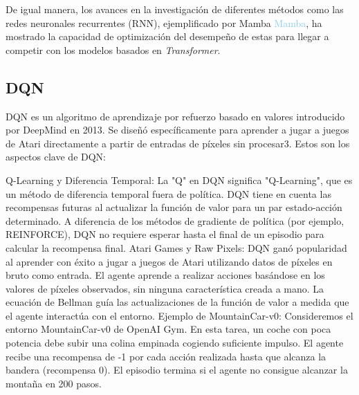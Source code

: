 De igual manera, los avances en la investigación de diferentes métodos como las redes neuronales recurrentes (RNN), ejemplificado por Mamba \textcolor{SkyBlue}{Mamba}, ha mostrado la capacidad de optimización del desempeño de estas para llegar a competir con los modelos basados en \textit{Transformer}.

\subsection{DQN}

DQN es un algoritmo de aprendizaje por refuerzo basado en valores introducido por DeepMind en 2013. Se diseñó específicamente para aprender a jugar a juegos de Atari directamente a partir de entradas de píxeles sin procesar3. Estos son los aspectos clave de DQN:

Q-Learning y Diferencia Temporal:
La "Q" en DQN significa "Q-Learning", que es un método de diferencia temporal fuera de política.
DQN tiene en cuenta las recompensas futuras al actualizar la función de valor para un par estado-acción determinado.
A diferencia de los métodos de gradiente de política (por ejemplo, REINFORCE), DQN no requiere esperar hasta el final de un episodio para calcular la recompensa final.
Atari Games y Raw Pixels:
DQN ganó popularidad al aprender con éxito a jugar a juegos de Atari utilizando datos de píxeles en bruto como entrada.
El agente aprende a realizar acciones basándose en los valores de píxeles observados, sin ninguna característica creada a mano.
La ecuación de Bellman guía las actualizaciones de la función de valor a medida que el agente interactúa con el entorno.
Ejemplo de MountainCar-v0:
Consideremos el entorno MountainCar-v0 de OpenAI Gym.
En esta tarea, un coche con poca potencia debe subir una colina empinada cogiendo suficiente impulso.
El agente recibe una recompensa de -1 por cada acción realizada hasta que alcanza la bandera (recompensa 0).
El episodio termina si el agente no consigue alcanzar la montaña en 200 pasos.




